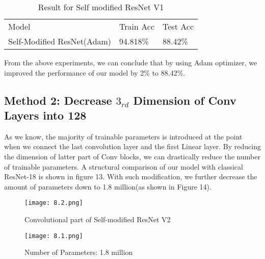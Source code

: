 \documentclass[letterpaper]{article} %
\begin{document}
\begin{table}[H]
	\centering
	\begin{tabular}{l|l|l}
    Model & Train Acc & Test Acc\\
    Self-Modified ResNet(Adam) & 94.818\%  & 88.42\%  \\
	\end{tabular}
	\caption{Result for Self modified ResNet V1}
\end{table}
From the above experiments, we can conclude that by using Adam optimizer, we improved the performance of our model by 2\% to 88.42\%.
\subsection{Method 2: Decrease $3_{rd}$ Dimension of Conv Layers into 128}
As we know, the majority of trainable parameters is introduced at the point when we connect the last convolution layer and the first Linear layer. By reducing the dimension of latter part of Conv blocks, we can drastically reduce the number of trainable parameters. A structural comparison of our model with classical ResNet-18 is shown in figure 13. With such modification, we further decrease the amount of parameters down to 1.8 million(as shown in Figure 14).
\begin{figure}[H]
	\texttt{[image: 8.2.png]}
	\caption{Convolutional part of Self-modified ResNet V2}
\end{figure}
\begin{figure}[H]
	\texttt{[image: 8.1.png]}
	\caption{Number of Parameters: 1.8 million}
\end{figure}
\end{document}
